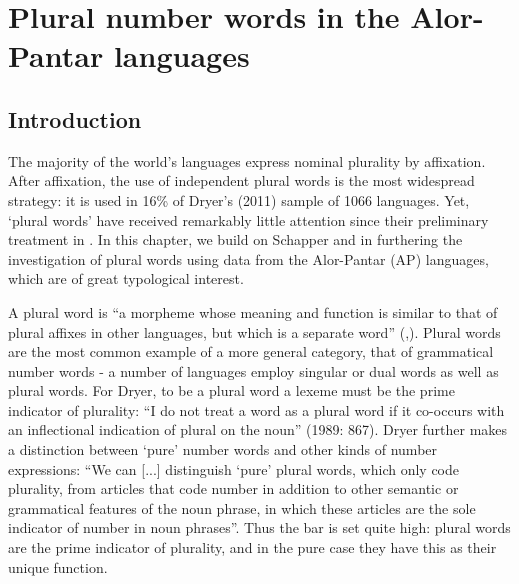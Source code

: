 
\chapter{Plural number words in the Alor-Pantar languages}

 

\section{Introduction}%
 
\hypertarget{Toc376962648}{}
The majority of the world's languages express nominal plurality by affixation. After affixation, the use of independent plural words is the most widespread strategy: it is used in 16\% of Dryer's (2011) sample of 1066 languages.\nocite{Dryer2011} Yet, `plural words' have received remarkably little attention since their preliminary treatment in \citet{Dryer1989}. In this chapter, we build on Schapper and \citet{Klamer2011} in furthering the investigation of plural words using data from the Alor-Pantar (AP) languages, which are of great typological interest.

A plural word is ``a morpheme whose meaning and function is similar to that of plural affixes in other languages, but which is a separate word'' (\citealt[865]{Dryer1989},\citealt[166]{Dryer2007}). Plural words are the most common example of a more general category, that of grammatical number words - a number of languages employ singular or dual words as well as plural words. For Dryer, to be a plural word a lexeme must be the prime indicator of plurality: ``I do not treat a word as a plural word if it co-occurs with an inflectional indication of plural on the noun'' (1989: 867). Dryer further makes a distinction between `pure' number words and other kinds of number expressions: ``We can [...] distinguish `pure' plural words, which only code plurality, from articles that code number in addition to other semantic or grammatical features of the noun phrase, in which these articles are the sole indicator of number in noun phrases''. Thus the bar is set quite high: plural words are the prime indicator of plurality, and in the
pure case they have this as their unique function.

